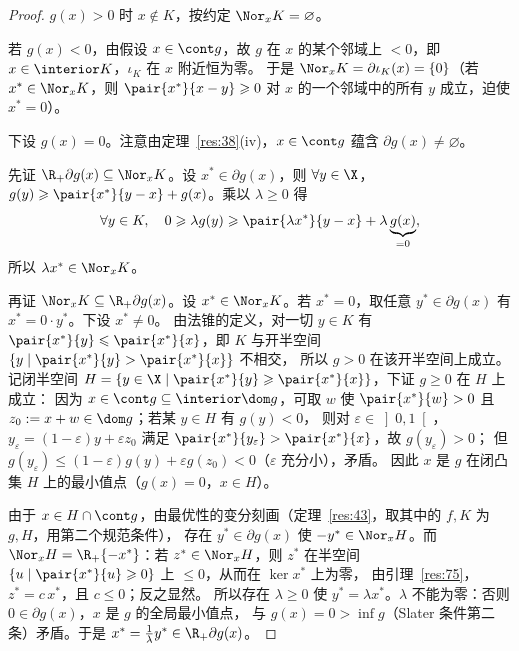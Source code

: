 \begin{proof}
$g(x)>0$ 时 $x\notin K$，按约定 $\Nor_xK=\varnothing$。

若 $g(x)<0$，由假设 $x\in\cont g$，故 $g$ 在 $x$ 的某个邻域上 $<0$，即 $x\in\interior K$，$\iota_K$ 在 $x$ 附近恒为零。
于是 $\Nor_xK=\partial\iota_K(x)=\{0\}$（若 $x^*\in\Nor_xK$，则 $\pair{x^*}{x-y}\geqslant0$ 对 $x$ 的一个邻域中的所有 $y$ 成立，迫使 $x^*=0$）。

下设 $g(x)=0$。注意由定理~\ref{res:38}(iv)，$x\in\cont g$ 蕴含 $\partial g(x)\neq\varnothing$。

先证 $\R_+\partial g(x)\subseteq\Nor_xK$。设 $x^*\in\partial g(x)$，则 $\forall y\in\X$，$g(y)\geqslant\pair{x^*}{y-x}+g(x)$。乘以 $\lambda\geqslant0$ 得
\[
  \forall y\in K,\quad0\geqslant\lambda g(y)\geqslant\pair{\lambda x^*}{y-x}+\lambda\underbrace{g(x)}_{=0},
\]
所以 $\lambda x^*\in\Nor_xK$。

再证 $\Nor_xK\subseteq\R_+\partial g(x)$。设 $x^*\in\Nor_xK$。若 $x^*=0$，取任意 $y^*\in\partial g(x)$ 有 $x^*=0\cdot y^*$。下设 $x^*\neq0$。
由法锥的定义，对一切 $y\in K$ 有 $\pair{x^*}{y}\leqslant\pair{x^*}{x}$，即 $K$ 与开半空间 $\{y\mid\pair{x^*}{y}>\pair{x^*}{x}\}$ 不相交，
所以 $g>0$ 在该开半空间上成立。记闭半空间 $H=\{y\in\X\mid\pair{x^*}{y}\geqslant\pair{x^*}{x}\}$，下证 $g\geqslant0$ 在 $H$ 上成立：
因为 $x\in\cont g\subseteq\interior\dom g$，可取 $w$ 使 $\pair{x^*}{w}>0$ 且 $z_0:=x+w\in\dom g$；若某 $y\in H$ 有 $g(y)<0$，
则对 $\varepsilon\in\left]0,1\right[$，$y_\varepsilon=(1-\varepsilon)y+\varepsilon z_0$ 满足 $\pair{x^*}{y_\varepsilon}>\pair{x^*}{x}$，故 $g(y_\varepsilon)>0$；
但 $g(y_\varepsilon)\leqslant(1-\varepsilon)g(y)+\varepsilon g(z_0)<0$（$\varepsilon$ 充分小），矛盾。
因此 $x$ 是 $g$ 在闭凸集 $H$ 上的最小值点（$g(x)=0$，$x\in H$）。

由于 $x\in H\cap\cont g$，由最优性的变分刻画（定理~\ref{res:43}，取其中的 $f,K$ 为 $g,H$，用第二个规范条件），
存在 $y^*\in\partial g(x)$ 使 $-y^*\in\Nor_xH$。而 $\Nor_xH=\R_+\{-x^*\}$：若 $z^*\in\Nor_xH$，则 $z^*$ 在半空间 $\{u\mid\pair{x^*}{u}\geqslant0\}$ 上 $\leqslant0$，从而在 $\ker x^*$ 上为零，
由引理~\ref{res:75}，$z^*=c\,x^*$，且 $c\leqslant0$；反之显然。
所以存在 $\lambda\geqslant0$ 使 $y^*=\lambda x^*$。$\lambda$ 不能为零：否则 $0\in\partial g(x)$，$x$ 是 $g$ 的全局最小值点，
与 $g(x)=0>\inf g$（Slater 条件第二条）矛盾。于是 $x^*=\frac1\lambda y^*\in\R_+\partial g(x)$。
\end{proof}

